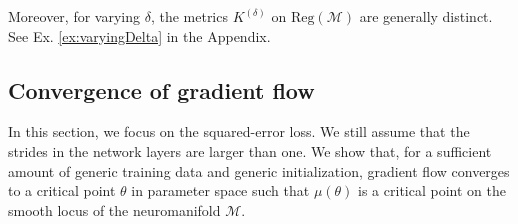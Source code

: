 \documentclass[twoside]{article}
\theoremstyle{definition}
\newtheorem{example}[theorem]{Example}
\theoremstyle{remark}
\begin{document}

Moreover, for varying $\delta$, the metrics $K^{(\delta)}$ on $\mathrm{Reg}(\mathcal{M})$ are generally distinct. See Ex. \ref{ex:varyingDelta} in the Appendix.






\subsection{Convergence of gradient flow}

In this section, we focus on the squared-error loss.
We still assume that the strides in the network layers are larger than one. 
We show that, for a sufficient amount of generic training data and generic initialization, gradient flow  converges to a critical point $\theta$ in parameter space such that $\mu(\theta)$ is a critical point on the smooth locus of the neuromanifold $\mathcal{M}$.
\end{document}
